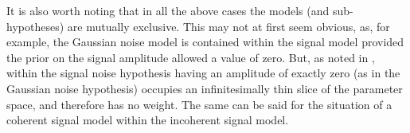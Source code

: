 It is also worth noting that in all the above cases the models (and sub-hypotheses) are mutually exclusive. This may not at first seem obvious, as,
for example, the Gaussian noise model is contained within the signal model provided the prior on the signal amplitude allowed a value of zero. But, as noted in
\citet{2012PhRvD..85h2003L, MaxCWpolariations}, within the signal noise hypothesis having an amplitude of exactly zero (as in the Gaussian
noise hypothesis) occupies an infinitesimally thin slice of the parameter space, and therefore has no weight. The same can be said for the situation of a coherent
signal model within the incoherent signal model.
